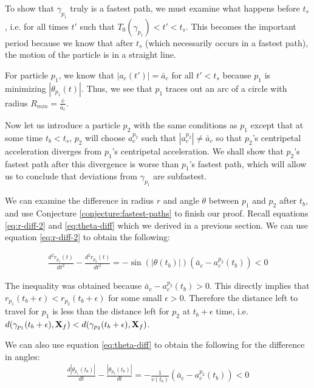 To show that $\gamma_{p_1}$ truly is a fastest path, we must examine what happens before $t_s$, i.e. for all times $t'$ such that $T_0(\gamma_{p_1}) < t' < t_s$. This becomes the important period because we know that after $t_s$ (which necessarily occurs in a fastest path), the motion of the particle is in a straight line.

For particle $p_1$, we know that $|a_c(t')| = \bar{a}_c$ for all $t' < t_s$ because $p_1$ is minimizing $|\theta_{p_1}(t)|$. Thus, we see that $p_1$ traces out an arc of a circle with radius $R_{min} = \frac{\bar{v}}{\bar{a}_c}$.

Now let us introduce a particle $p_2$ with the same conditions as $p_1$ except that at some time $t_b < t_s$, $p_2$ will choose $a^{p_2}_c$ such that $|a^{p_2}_c| \neq \bar{a}_c$ so that $p_2$'s centripetal acceleration diverges from $p_1$'s centripetal acceleration. We shall show that $p_2$'s fastest path after this divergence is worse than $p_1$'s fastest path, which will allow us to conclude that deviations from $\gamma_{p_1}$ are subfastest.

We can examine the difference in radius $r$ and angle $\theta$ between $p_1$ and $p_2$ after $t_b$, and use Conjecture \ref{conjecture:fastest-paths} to finish our proof. Recall equations \ref{eq:r-diff-2} and \ref{eq:theta-diff} which we derived in a previous section. We can use equation \ref{eq:r-diff-2} to obtain the following:

\begin{eqnarray}
  \frac{d^2 r_{p_1}(t)}{d t^2} - \frac{d^2 r_{p_2}(t)}{d t^2} = - \sin(| \theta(t_b) |) \left( \bar{a}_c - a^{p_2}_c(t_b) \right) < 0
\end{eqnarray}

The inequality was obtained because $\bar{a}_c - a^{p_2}_c(t_b) > 0$. This directly implies that $r_{p_1}(t_b + \epsilon) < r_{p_2}(t_b + \epsilon)$ for some small $\epsilon > 0$. Therefore the distance left to travel for $p_1$ is less than the distance left for $p_2$ at $t_b + \epsilon$ time, i.e. $d(\gamma_{p_1}(t_b + \epsilon), \mathbf{X}_f) < d(\gamma_{p_2}(t_b + \epsilon), \mathbf{X}_f)$.

We can also use equation \ref{eq:theta-diff} to obtain the following for the difference in angles:
\begin{eqnarray}
  \frac{d | \theta_{p_1}(t_b) |}{dt} - \frac{ |\theta_{p_2} (t_b) |}{dt} = - \frac{1}{v(t_b)} \left(\bar{a}_c - a^{p_2}_c(t_b) \right) < 0
\end{eqnarray}

